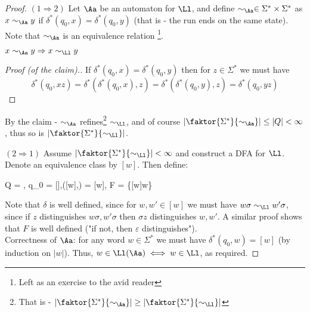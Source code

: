 \begin{proof}
		$(1\Rightarrow 2)$ Let $\Aa$ be an automaton for $\Ll$, and define $\sim_\Aa\in \Sigma^*\times \Sigma^*$ as $x\sim_\Aa y$ if $\delta^*(q_0,x) = \delta^*(q_0,y)$ (that is - the run ends on the same state). Note that $\sim_\Aa$ is an equivalence relation \footnote{Left as an exercise to the avid reader}.
		\begin{mythrm}[Claim.]
			$x\sim_{\Aa} y \Rightarrow x\sim_{\Ll} y$
		\end{mythrm}
		\begin{proof}
			[Proof (of the claim).] If $\delta^*(q_0,x) = \delta^*(q_0,y)$ then for $z\in \Sigma^*$ we must have $$\delta^*(q_0,xz) = \delta^*(\delta^*(q_0,x),z) = \delta^*(\delta^*(q_0,y),z) = \delta^*(q_0,yz)$$
		\end{proof}
		By the claim - $\sim_{\Aa}$ refines\footnote{That is - $\left|\faktor{\Sigma^*}{\sim_\Aa}\right| \geq \left|\faktor{\Sigma^*}{\sim_{\Ll}}\right|$} $\sim_\Ll$, and of course $\left|\faktor{\Sigma^*}{\sim_\Aa}\right| \leq |Q| < \infty$, thus so is $\left|\faktor{\Sigma^*}{\sim_\Ll}\right|$.


		$(2\Rightarrow 1)$ Assume $\left|\faktor{\Sigma^*}{\sim_\Ll}\right| < \infty$ and construct a DFA for $\Ll$. Denote an equivalence class by $[w]$. Then define:
		\begin{flalign*}
			Q = \faktor{\Sigma^*}{\sim_\Ll}, \quad q_0 = [\varepsilon],\quad \delta([w],\sigma) = [w\cdot\sigma], \quad F = \{[w]\mid w\in \Ll\}
		\end{flalign*}
		Note that $\delta$ is well defined, since for $w,w'\in [w]$ we must have $ w\sigma \sim_{\Ll} w'\sigma$, since if $z$ distinguishes $w\sigma, w'\sigma$ then $\sigma z$ distinguishes $w,w'$. A similar proof shows that $F$ is well defined ("if not, then $\varepsilon$ distinguishes").\\
		Correctness of $\Aa$: for any word $w\in \Sigma^*$ we must have $\delta^*(q_0, w) = [w]$ (by induction on $|w|$). Thus, $w\in \Ll(\Aa) \iff w\in \Ll$, as required.

\end{proof}
